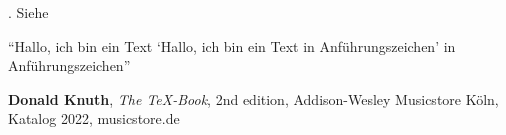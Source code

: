\documentclass[12pt,ngerman,parskip=full]{scrartcl}
\begin{document}
\blindtext. Siehe \cite{knuth:84}

\enquote{Hallo, ich bin ein Text \enquote{Hallo, ich bin ein Text in Anführungszeichen} in Anführungszeichen}

\begin{thebibliography}{9}
 \textbf{Donald Knuth}, \textit{The \TeX-Book}, 2nd edition, Addison-Wesley
 Musicstore Köln, Katalog 2022, musicstore.de
\end{thebibliography}
\end{document}
